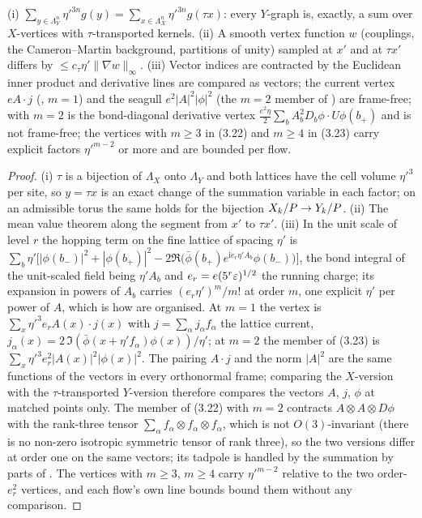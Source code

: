 \begin{lemma}\label{rot:lem:vert}
\textup{(i)} $\sum_{y\in\Lambda_Y^n}\eta'^{3n}g(y)=\sum_{x\in\Lambda_X^n}\eta'^{3n}g(\tau x)$: every $Y$-graph is, exactly, a sum over $X$-vertices with $\tau$-transported kernels. \textup{(ii)} A smooth vertex function $w$ (couplings, the Cameron--Martin background, partitions of unity) sampled at $x'$ and at $\tau x'$ differs by $\le c_\tau\eta'\|\nabla w\|_\infty$. \textup{(iii)} Vector indices are contracted by the Euclidean inner product and derivative lines are compared as vectors; the current vertex $eA\cdot j$ (\cite[(3.22)]{K1}, $m=1$) and the seagull $e^2|A|^2|\phi|^2$ (the $m=2$ member of \cite[(3.23)]{K1}) are frame-free; \cite[(3.22)]{K1} with $m=2$ is the bond-diagonal derivative vertex $\frac{e^2\eta}2\sum_bA_b^2D_b\phi\cdot U\phi(b_+)$ and is not frame-free; the vertices with $m\ge3$ in (3.22) and $m\ge4$ in (3.23) carry explicit factors $\eta'^{m-2}$ or more and are bounded per flow.
\end{lemma}
\begin{proof}
(i) $\tau$ is a bijection of $\Lambda_X$ onto $\Lambda_Y$ and both lattices have the cell volume $\eta'^3$ per site, so $y=\tau x$ is an exact change of the summation variable in each factor; on an admissible torus the same holds for the bijection $X_k/P\to Y_k/P$. (ii) The mean value theorem along the segment from $x'$ to $\tau x'$. (iii) In the unit scale of level $r$ the hopping term on the fine lattice of spacing $\eta'$ is $\sum_b\eta'\big[|\phi(b_-)|^2+|\phi(b_+)|^2-2\Re\big(\bar\phi(b_+)e^{\mathrm ie_r\eta'A_b}\phi(b_-)\big)\big]$, the bond integral of the unit-scaled field being $\eta'A_b$ \cite[(2.20)]{K1} and $e_r=e(5^r\varepsilon)^{1/2}$ the running charge; its expansion in powers of $A_b$ carries $(e_r\eta')^m/m!$ at order $m$, one explicit $\eta'$ per power of $A$, which is how \cite[(3.22)--(3.23)]{K1} are organised. At $m=1$ the vertex is $\sum_x\eta'^3e_rA(x)\cdot j(x)$ with $j=\sum_\alpha j_\alpha f_\alpha$ the lattice current, $j_\alpha(x)=2\,\Im(\bar\phi(x+\eta'f_\alpha)\phi(x))/\eta'$; at $m=2$ the member of (3.23) is $\sum_x\eta'^3e_r^2|A(x)|^2|\phi(x)|^2$. The pairing $A\cdot j$ and the norm $|A|^2$ are the same functions of the vectors in every orthonormal frame; comparing the $X$-version with the $\tau$-transported $Y$-version therefore compares the vectors $A$, $j$, $\phi$ at matched points only. The member of (3.22) with $m=2$ contracts $A\otimes A\otimes D\phi$ with the rank-three tensor $\sum_\alpha f_\alpha\otimes f_\alpha\otimes f_\alpha$, which is not $O(3)$-invariant (there is no non-zero isotropic symmetric tensor of rank three), so the two versions differ at order one on the same vectors; its tadpole is handled by the summation by parts of . The vertices with $m\ge3$, $m\ge4$ carry $\eta'^{m-2}$ relative to the two order-$e_r^2$ vertices, and each flow's own line bounds \cite[(3.63)--(3.65)]{K1} bound them without any comparison.
\end{proof}

